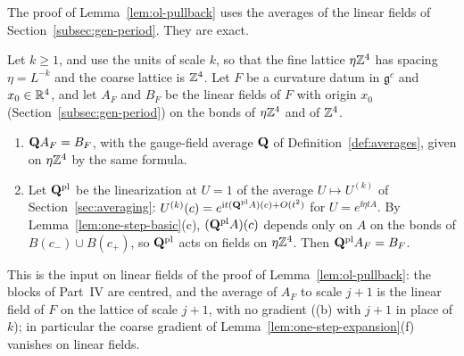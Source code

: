 The proof of Lemma~\ref{lem:ol-pullback} uses the averages of the linear fields of Section~\ref{subsec:gen-period}. They are exact.

\begin{lemma}\label{lem:ol-linear-average}
Let $k\ge1$, and use the units of scale $k$, so that the fine lattice $\eta\mathbb Z^4$ has spacing $\eta=L^{-k}$ and the coarse lattice is $\mathbb Z^4$. Let $F$ be a curvature datum in $\mathfrak g^c$ and $x_0\in\mathbb R^4$, and let $A_F$ and $B_F$ be the linear fields of $F$ with origin $x_0$ (Section~\ref{subsec:gen-period}) on the bonds of $\eta\mathbb Z^4$ and of $\mathbb Z^4$.
\begin{enumerate}[label=(\alph*)]
\item $\mathbf Q A_F=B_F$, with the gauge-field average $\mathbf Q$ of Definition~\ref{def:averages}, given on $\eta\mathbb Z^4$ by the same formula.
\item Let $\mathbf Q^{\rm pl}$ be the linearization at $U=1$ of the average $U\mapsto U^{(k)}$ of Section~\ref{sec:averaging}: $U^{(k)}(c)=e^{\mathrm i t(\mathbf Q^{\rm pl}A)(c)+O(t^2)}$ for $U=e^{\ii\eta tA}$. By Lemma~\ref{lem:one-step-basic}(c), $(\mathbf Q^{\rm pl}A)(c)$ depends only on $A$ on the bonds of $B(c_-)\cup B(c_+)$, so $\mathbf Q^{\rm pl}$ acts on fields on $\eta\mathbb Z^4$. Then $\mathbf Q^{\rm pl}A_F=B_F$.
\end{enumerate}
\end{lemma}

This is the input on linear fields of the proof of Lemma~\ref{lem:ol-pullback}: the blocks of Part~IV are centred, and the average of $A_F$ to scale $j+1$ is the linear field of $F$ on the lattice of scale $j+1$, with no gradient ((b) with $j+1$ in place of $k$); in particular the coarse gradient of Lemma~\ref{lem:one-step-expansion}(f) vanishes on linear fields.

